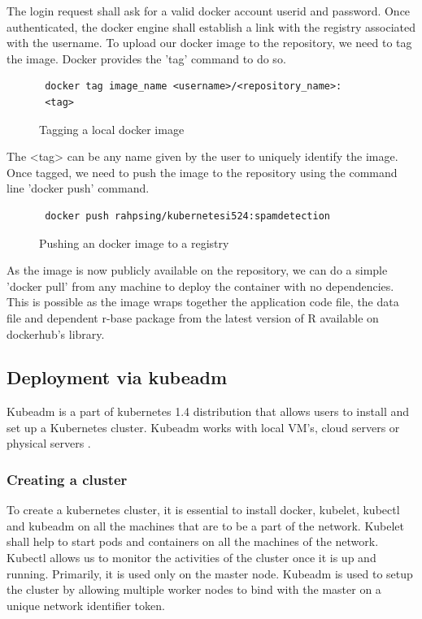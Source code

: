 \documentclass[9pt,twocolumn,twoside]{../../styles/osajnl}
\begin{document}
{\noindent
The login request shall ask for a valid docker account userid and
password. Once authenticated, the docker engine shall establish a link
with the registry associated with the username. To upload our docker
image to the repository, we need to tag the image. Docker provides the
'tag' command to do so.

\begin{figure}[H]
\begin{verbatim}
 docker tag image_name <username>/<repository_name>:
 <tag>
\end{verbatim}
\caption{Tagging a local docker image}
\label{Tagging a local docker image}
\end{figure}

\noindent
The <tag> can be any name given by the user to uniquely identify the
image. Once tagged, we need to push the image to the repository using
the command line 'docker push' command.

\begin{figure}[H]
\begin{verbatim}
 docker push rahpsing/kubernetesi524:spamdetection
\end{verbatim}
\caption{Pushing an docker image to a registry}
\label{Pushing an docker image to a registry}
\end{figure}

\noindent
As the image is now publicly available on the repository, we can do a
simple 'docker pull' from any machine to deploy the container with no
dependencies. This is possible as the image wraps together the
application code file, the data file and dependent r-base package from
the latest version of R available on dockerhub's library.

\subsection{Deployment via kubeadm}

Kubeadm is a part of kubernetes 1.4 distribution that allows users to
install and set up a Kubernetes cluster. Kubeadm works with local
VM's, cloud servers or physical servers \cite{www-kubernetes-kubeadm}.

\subsubsection{Creating a cluster}
To create a kubernetes cluster, it is essential to install docker,
kubelet, kubectl and kubeadm on all the machines that are to be a part
of the network. Kubelet shall help to start pods and containers on all
the machines of the network. Kubectl allows us to monitor the
activities of the cluster once it is up and running. Primarily, it is
used only on the master node. Kubeadm is used to setup the cluster by
allowing multiple worker nodes to bind with the master on a unique
network identifier token.

}
\end{document}

